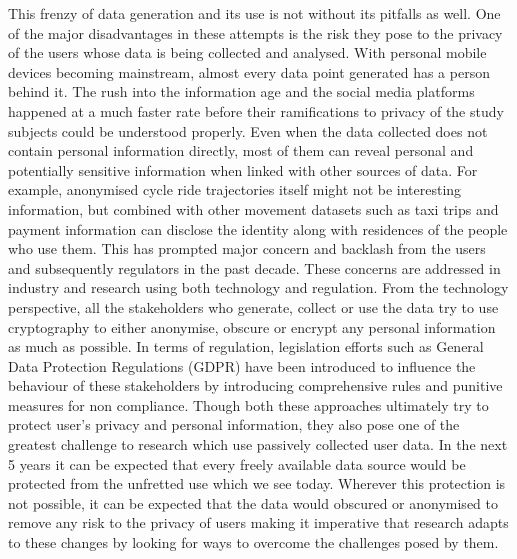 This frenzy of data generation and its use is not without its pitfalls as well. 
One of the major disadvantages in these attempts is the risk they pose to the privacy of the users whose data is being collected and analysed. 
With personal mobile devices becoming mainstream, almost every data point generated has a person behind it.
The rush into the information age and the social media platforms happened at a much faster rate before their ramifications to privacy of the study subjects could be understood properly.
Even when the data collected does not contain personal information directly, most of them can reveal personal and potentially sensitive information when linked with other sources of data.
For example, anonymised cycle ride trajectories itself might not be interesting information, but combined with other movement datasets such as taxi trips and payment information can disclose the identity along with residences of the people who use them.
This has prompted major concern and backlash from the users and subsequently regulators in the past decade.
These concerns are addressed in industry and research using both technology and regulation.
From the technology perspective, all the stakeholders who generate, collect or use the data try to use cryptography to either anonymise, obscure or encrypt any personal information as much as possible. 
In terms of regulation, legislation efforts such as General Data Protection Regulations (GDPR) have been introduced to influence the behaviour of these stakeholders by introducing comprehensive rules and punitive measures for non compliance.
Though both these approaches ultimately try to protect user's privacy and personal information, they also pose one of the greatest challenge to research which use passively collected user data. 
In the next 5 years it can be expected that every freely available data source would be protected from the unfretted use which we see today.
Wherever this protection is not possible, it can be expected that the data would obscured or anonymised to remove any risk to the privacy of users making it imperative that research adapts to these changes by looking for ways to overcome the challenges posed by them.



